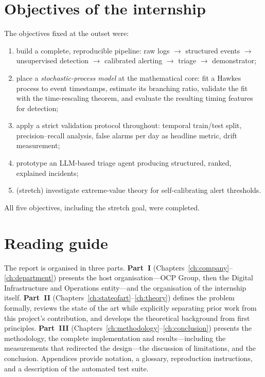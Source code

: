 \documentclass[11pt,a4paper]{report}
\begin{document}
\section{Objectives of the internship}
The objectives fixed at the outset were:
\begin{enumerate}[nosep,leftmargin=1.6em]
  \item build a complete, reproducible pipeline: raw logs $\to$ structured
  events $\to$ unsupervised detection $\to$ calibrated alerting $\to$ triage
  $\to$ demonstrator;
  \item place a \emph{stochastic-process model} at the mathematical core: fit
  a Hawkes process to event timestamps, estimate its branching ratio,
  validate the fit with the time-rescaling theorem, and evaluate the
  resulting timing features for detection;
  \item apply a strict validation protocol throughout: temporal train/test
  split, precision--recall analysis, false alarms per day as headline metric,
  drift measurement;
  \item prototype an LLM-based triage agent producing structured, ranked,
  explained incidents;
  \item (stretch) investigate extreme-value theory for self-calibrating alert
  thresholds.
\end{enumerate}
All five objectives, including the stretch goal, were completed.

\section{Reading guide}
The report is organised in three parts.
\textbf{Part~I} (Chapters~\ref{ch:company}--\ref{ch:department}) presents the
host organisation---OCP Group, then the Digital Infrastructure and Operations
entity---and the organisation of the internship itself.
\textbf{Part~II} (Chapters~\ref{ch:stateofart}--\ref{ch:theory}) defines the
problem formally, reviews the state of the art while explicitly separating
prior work from this project's contribution, and develops the theoretical
background from first principles.
\textbf{Part~III} (Chapters~\ref{ch:methodology}--\ref{ch:conclusion})
presents the methodology, the complete implementation and results---including
the measurements that redirected the design---the discussion of limitations,
and the conclusion. Appendices provide notation, a glossary, reproduction
instructions, and a description of the automated test suite.

\end{document}
